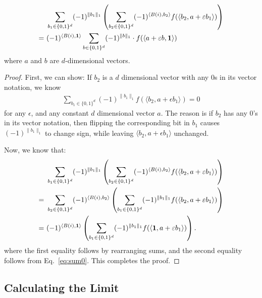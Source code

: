 \begin{lemma}\label{lem:eigsum}
\begin{align*}
& ~ \sum_{b_1 \in \{0,1\}^d} (-1)^{\|b_1\|_1} \left(\sum_{b_2 \in \{0, 1\}^d} (-1)^{\langle B(i), b_2 \rangle} f(\langle b_2, a + \epsilon b_1 \rangle) \right)\\
= & ~ (-1)^{\langle B(i), {\bf 1} \rangle} \sum_{b \in \{0, 1\}^d} (-1)^{\|b\|_1} \cdot f ( \langle a + \epsilon b, {\bf 1} \rangle  )
\end{align*}
where $a$ and $b$ are $d$-dimensional vectors.
\end{lemma}
\begin{proof}


First, we can show: 
If $b_2$ is a $d$ dimensional vector with any $0$s in its vector notation, we know
\begin{align}\label{eq:sum0}
\sum_{b_1 \in \{0,1\}^d} (-1)^{\|b_1\|_1} f(\langle b_2, a + \epsilon b_1 \rangle )  = 0
\end{align}
for any $\epsilon$, and any constant $d$ dimensional vector $a$. The reason is if $b_2$ has any $0$'s in its vector notation, then flipping the corresponding bit in $b_1$ causes $(-1)^{\|b_1\|_1}$ to change sign, while leaving $\langle b_2, a+\epsilon b_1 \rangle$ unchanged.

Now, we know that: 
\begin{align*}%
& ~ \sum_{b_1 \in \{0,1\}^d} (-1)^{\|b_1\|_1} \left(\sum_{b_2 \in \{0, 1\}^d} (-1)^{\langle B(i), b_2 \rangle} f(\langle b_2, a + \epsilon b_1 \rangle) \right) \notag\\
= & ~ \nonumber
\sum_{b_2 \in \{0, 1\}^d} (-1)^{\langle B(i), b_2 \rangle}
 \left(\sum_{b_1 \in \{0,1\}^d} (-1)^{\|b_1\|_1} f(\langle b_2, a + \epsilon b_1 \rangle) \right)\\
= & ~ (-1)^{\langle B(i), {\bf 1} \rangle}
 \left(\sum_{b_1 \in \{0,1\}^d} (-1)^{\|b_1\|_1} f(\langle {\bf 1}, a + \epsilon b_1 \rangle) \right).
\end{align*}
where the first equality follows by rearranging sums, and the second equality follows from Eq.~\eqref{eq:sum0}. This completes the proof. 

\end{proof}



\subsection{Calculating the Limit}\label{sec:converge}

